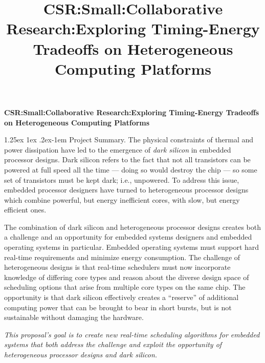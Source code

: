 \documentclass[10pt,letterpaper]{article}
\title{\textbf{CSR:Small:Collaborative Research:Exploring Timing-Energy Tradeoffs on Heterogeneous Computing Platforms}}
\date{\vspace{4mm}}
\makeatletter
\renewcommand{\paragraph}{%
  \@startsection{paragraph}{4}%
  {\z@}{1.25ex \@plus 1ex \@minus .2ex}{-1em}%
  {\normalfont\normalsize\bfseries}%
}
\makeatother
\begin{document}




\thispagestyle{empty}


\begin{center}
\Large{\textbf{CSR:Small:Collaborative Research:Exploring Timing-Energy Tradeoffs on Heterogeneous Computing Platforms}}
\end{center}

\paragraph{Project Summary.}
The physical constraints of thermal and power dissipation have led to
the emergence of \emph{dark silicon} in embedded processor designs.
Dark silicon refers to the fact that not all transistors can be
powered at full speed all the time --- doing so would destroy the chip
--- so some set of transistors must be kept dark; i.e., unpowered.  To
address this issue, embedded processor designers have turned to
heterogeneous processor designs which combine powerful, but energy
inefficient cores, with slow, but energy efficient ones.

The combination of dark silicon and heterogeneous processor designs
creates both a challenge and an opportunity for embedded systems
designers and embedded operating systems in particular.  Embedded
operating systems must support hard real-time requirements and
minimize energy consumption.  The challenge of heterogeneous designs
is that real-time schedulers must now incorporate knowledge of
differing core types and reason about the diverse design space of
scheduling options that arise from multiple core types on the same
chip.  The opportunity is that dark silicon effectively creates a
``reserve'' of additional computing power that can be brought to bear
in short bursts, but is not sustainable without damaging the hardware.

\emph{This proposal's goal is to create new real-time scheduling
  algorithms for embedded systems that both address the challenge and
  exploit the opportunity of heterogeneous processor designs and dark
  silicon.}
\end{document}
